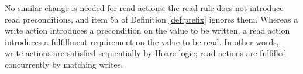 No similar change is needed for read actions: the read rule does not
introduce read preconditions, and item 5a of Definition \ref{def:prefix} ignores
them.  Whereas a write action introduces a precondition on the value to be
written, a read action introduces a fulfillment requirement on the value to
be read.  In other words, write actions are satisfied sequentially by Hoare
logic; read actions are fulfilled concurrently by matching writes.






